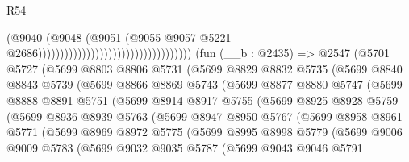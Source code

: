 \begin{lexlean}{R54}
\begin{coremodule}
                                                                  (@9040
                                                                    (@9048
                                                                      (@9051
                                                                        (@9055
                                                                          @9057
                                                                          @5221
                                                                          @2686)))))))))))))))))))))))))))))))))))
    (fun (__b : @2435) =>
    @2547
      (@5701
        @5727
        (@5699
          @8803
          @8806
          @5731
          (@5699
            @8829
            @8832
            @5735
            (@5699
              @8840
              @8843
              @5739
              (@5699
                @8866
                @8869
                @5743
                (@5699
                  @8877
                  @8880
                  @5747
                  (@5699
                    @8888
                    @8891
                    @5751
                    (@5699
                      @8914
                      @8917
                      @5755
                      (@5699
                        @8925
                        @8928
                        @5759
                        (@5699
                          @8936
                          @8939
                          @5763
                          (@5699
                            @8947
                            @8950
                            @5767
                            (@5699
                              @8958
                              @8961
                              @5771
                              (@5699
                                @8969
                                @8972
                                @5775
                                (@5699
                                  @8995
                                  @8998
                                  @5779
                                  (@5699
                                    @9006
                                    @9009
                                    @5783
                                    (@5699
                                      @9032
                                      @9035
                                      @5787
                                      (@5699
                                        @9043
                                        @9046
                                        @5791

\end{coremodule}
\end{lexlean}
